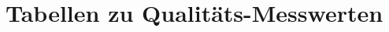 \documentclass[a4paper, 10pt, twoside, onecolumn, parskip]{scrartcl}
\begin{document}

    \section{Tabellen zu Qualitäts-Messwerten} \label{app:qualität}
\end{document}
